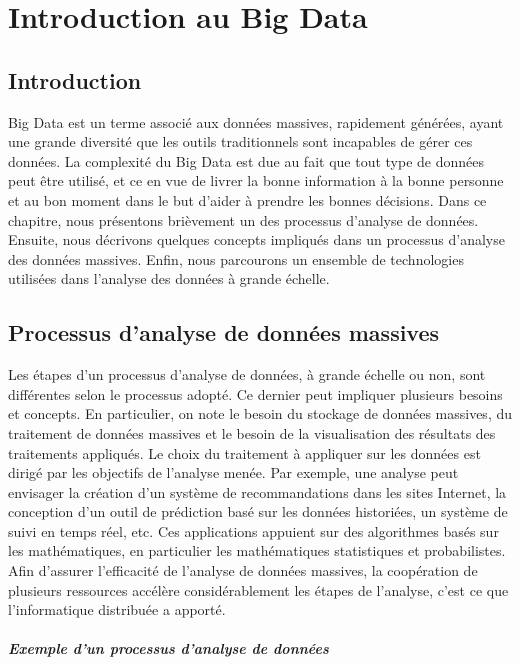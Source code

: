 \chapter{Introduction au Big Data} \label{chap:big-data-intro}
	\section{Introduction}
		Big Data est un terme associé aux données massives, rapidement générées, ayant une grande diversité que les  outils traditionnels sont incapables de gérer ces données. La complexité du Big Data est due au  fait que tout type de données peut être utilisé, et ce en vue de livrer la bonne information à la bonne personne et au bon moment dans le but d'aider à prendre les bonnes décisions. Dans ce chapitre, nous  présentons brièvement un des processus d'analyse de données. Ensuite, nous décrivons quelques concepts impliqués dans un processus d'analyse des données massives. Enfin, nous parcourons un ensemble de technologies utilisées dans l'analyse des données à grande échelle.
			
	\section{Processus d'analyse de données massives}
Les étapes d'un processus d'analyse de données, à grande échelle ou non, sont différentes selon le processus adopté.  Ce dernier peut impliquer plusieurs besoins et concepts. En particulier, on note le besoin du stockage de données massives, du traitement de données massives et le besoin de la visualisation des résultats des traitements appliqués. Le choix du traitement à appliquer sur les données est dirigé par les objectifs de  l'analyse menée. Par exemple, une analyse peut envisager la création d'un système de recommandations dans les sites Internet, la conception d'un outil de prédiction basé sur les données historiées, un système de suivi en temps réel, etc.  Ces applications appuient sur des algorithmes basés sur les mathématiques, en particulier les mathématiques statistiques et probabilistes. Afin d'assurer l'efficacité de l'analyse de données massives, la coopération de plusieurs ressources accélère considérablement les étapes de l'analyse, c'est ce que l'informatique distribuée a apporté.
\paragraph{Exemple d'un  processus d'analyse de données} \label{sec:process-data-analysis}~

